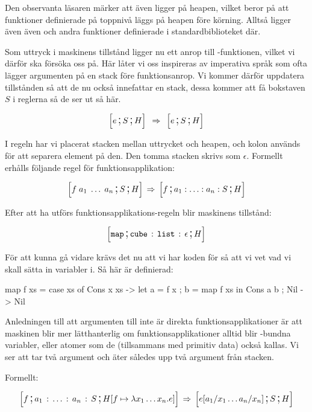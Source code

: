 \documentclass[../Core]{subfiles}
\begin{document}
Den observanta läsaren märker att även  ligger på heapen, vilket
beror på att funktioner definierade på toppnivå läggs på heapen före körning.
Alltså ligger även även  och andra funktioner definierade
i standardbiblioteket där.

Som uttryck i maskinens tillstånd ligger nu ett anrop till
-funktionen, vilket vi därför ska försöka oss på.
Här låter vi oss inspireras av imperativa språk som ofta lägger argumenten
på en stack före funktionsanrop. Vi kommer därför uppdatera tillstånden så att de
nu också innefattar en stack, dessa kommer att få bokstaven $S$ i reglerna så de
ser ut så här.

\begin{equation*} 
\text{\large$$}\Big[e \,\text{\Large;}\, S \,\text{\Large;}\, H\Big] \; \,\Rightarrow\, \; \text{\large$$}\Big[e \,\text{\Large;}\, S \,\text{\Large;}\, H\Big]
\end{equation*} 

I regeln har vi placerat stacken mellan uttrycket och heapen, och kolon används
för att separera element på den. Den tomma stacken skrivs som $\epsilon$.
Formellt erhålls följande regel för funktionsapplikation:

\[
\text{\large$$}\Big[f\; a_{1}\;\ldots\; a_{n}\,\text{\Large;}\, S \,\text{\Large;}\, H\Big]\,\Rightarrow\, \text{\large$$}\Big[f\,\text{\Large;}\, a_{1}:\ldots:a_{n}:S\,\text{\Large;}\, H\Big]
\]


Efter att ha utförs funktionsapplikations-regeln blir maskinens tillstånd:

\[
\text{\large$$}\Big[\mathtt{map} \,\text{\Large;}\, \mathtt{cube} \,:\, \mathtt{list} \,:\, \epsilon \,\text{\Large;}\, H\Big]
\]

För att kunna gå vidare krävs det nu att vi har koden för  så att vi vet
vad vi skall sätta in variabler i. Så här är  definierad:


\begin{codeEx}
map f xs = case xs of
    { Cons x xs -> let { a = f x
                       ; b = map f xs
                       } in Cons a b
    ; Nil       -> Nil
    }
\end{codeEx}

Anledningen till att argumenten till  inte är direkta funktionsapplikationer
är att maskinen blir mer lätthanterlig om funktionsapplikationer alltid
blir -bundna variabler, eller atomer som de (tillsammans med primitiv data)
också kallas. Vi ser att  tar två argument och äter således upp två
argument från stacken.

Formellt:

\[
\text{\large$$}\Big[f \,\text{\Large;}\, a_{1} \,:\, \ldots \,:\, a_{n} \,:\, S \,\text{\Large;}\, H[f\mapsto\lambda x_{1}\ldots x_{n}.e]\Big]\,\Rightarrow\, \text{\large$$}\Big[e[a{}_{1}/x_{1}\ldots a_{n}/x_{n}] \,\text{\Large;}\, S \,\text{\Large;}\, H\Big]
\]
\end{document}
